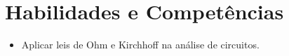 \section{Habilidades e Competências}
\begin{itemize}
\item Aplicar leis de Ohm e Kirchhoff na análise de circuitos.
\end{itemize}
